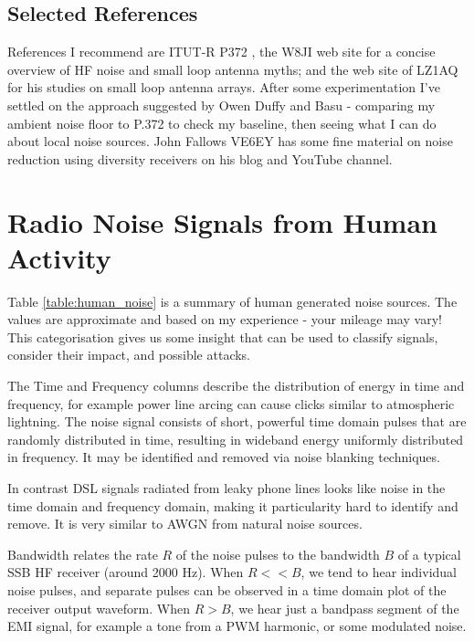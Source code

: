 \documentclass{article}
\begin{document}
\subsection{Selected References}

References I recommend are ITUT-R P372 \cite{itu372-16}, the W8JI web site \cite{w8ji_radio_noise} for a concise overview of HF noise and small loop antenna myths; and the web site of LZ1AQ \cite{lz1aq} for his studies on small loop antenna arrays. After some experimentation \cite{rowetel_noise_city} I've settled on the approach suggested by Owen Duffy \cite{duffy_lig} and Basu \cite{vu2nsb_s_meter} - comparing my ambient noise floor to P.372 to check my baseline, then seeing what I can do about local noise sources. John Fallows VE6EY \cite{ve6ey} has some fine material on noise reduction using diversity receivers on his blog and YouTube channel.

\section{Radio Noise Signals from Human Activity}

Table \ref{table:human_noise} is a summary of human generated noise sources.  The values are approximate and based on my experience - your mileage may vary!  This categorisation gives us some insight that can be used to classify signals, consider their impact, and possible attacks.

The Time and Frequency columns describe the distribution of energy in time and frequency, for example power line arcing can cause clicks similar to atmospheric lightning.  The noise signal consists of short, powerful time domain pulses that are randomly distributed in time, resulting in wideband energy uniformly distributed in frequency. It may be identified and removed via noise blanking techniques.

In contrast DSL signals radiated from leaky phone lines looks like noise in the time domain and frequency domain, making it particularity hard to identify and remove.  It is very similar to AWGN from natural noise sources.

Bandwidth relates the rate $R$ of the noise pulses to the bandwidth $B$ of a typical SSB HF receiver (around 2000 Hz).  When $R<<B$, we tend to hear individual noise pulses, and separate pulses can be observed in a time domain plot of the receiver output waveform.  When $R>B$, we hear just a bandpass segment of the EMI signal, for example a tone from a PWM harmonic, or some modulated noise.
\end{document}
